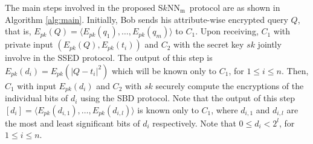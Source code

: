 \documentclass{article}
\newcommand{\sknnm}{S$k$NN$_\textrm{m}$}
\begin{document}
The main steps involved in the proposed \sknnm~protocol are as shown 
in Algorithm \ref{alg:main}. Initially, Bob sends his attribute-wise encrypted query $Q$, that 
is, $E_{pk}(Q) = \langle E_{pk}(q_1),\ldots, E_{pk}(q_m)\rangle$  
to $C_1$. Upon receiving, $C_1$ with private input $(E_{pk}(Q), E_{pk}(t_i))$ 
and $C_2$ with the secret key $sk$ jointly involve in the SSED protocol. The output 
of this step is $E_{pk}(d_i) = E_{pk}(|Q - t_i|^2)$ which will be known only to $C_1$, for 
$1 \le i \le n$. Then, $C_1$ with input $E_{pk}(d_i)$ and $C_2$ with $sk$ securely 
compute the encryptions of the individual bits of $d_i$ using the SBD protocol. Note 
that the output of this step $[d_i] = \langle E_{pk}(d_{i,1}), \ldots, E_{pk}(d_{i,l})\rangle$ is known 
only to $C_1$, where $d_{i,1}$ and $d_{i,l}$ are the most 
and least significant bits of $d_i$ respectively. Note that $0 \le d_i < 2^l$, for $1 \le i \le n$. 
\end{document}
